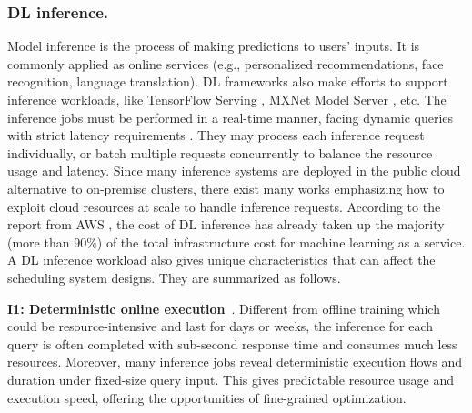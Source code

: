 \subsubsection{DL inference.}
\label{sec_background-inference}Model inference is the process of making predictions to users' inputs. It is commonly applied as online services (e.g., personalized recommendations, face recognition, language translation). DL frameworks also make efforts to support inference workloads, like TensorFlow Serving \cite{TensorFlow-Serving}, MXNet Model Server \cite{MXNET-mms}, etc. The inference jobs must be performed in a real-time manner, facing dynamic queries with strict latency requirements \cite{zhang2019mark}. They may process each inference request individually, or batch multiple requests concurrently to balance the resource usage and latency. Since many inference systems are deployed in the public cloud alternative to on-premise clusters, there exist many works emphasizing how to exploit cloud resources at scale to handle inference requests.
According to the report from AWS \cite{aws2019}, the cost of DL inference has already taken up the majority (more than 90\%) of the total infrastructure cost for machine learning as a service. A DL inference workload also gives unique characteristics that can affect the scheduling system designs. They are summarized as follows.

























\textbf{I1: Deterministic online execution}~\cite{Arpan2020clockwork,cuiEnable2021}. Different from offline training which could be resource-intensive and last for days or weeks, the inference for each query is often completed with sub-second response time and consumes much less resources.  Moreover, many inference jobs reveal deterministic execution flows and duration under fixed-size query input. This gives predictable resource usage and execution speed, offering the opportunities of fine-grained optimization.



